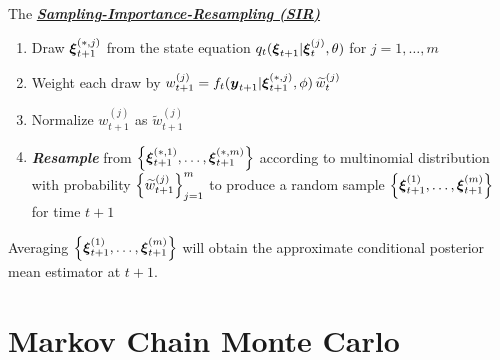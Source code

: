 \documentclass[11pt]{article}
\begin{document}
\begin{itemize}
The \underline{\emph{\textbf{Sampling-Importance-Resampling (SIR)}}}
\begin{enumerate}
\item Draw $\boldsymbol{\xi}_{t+1}^{(*,j)}$ from the state equation $q_{t}(\boldsymbol{\xi}_{t+1} | \boldsymbol{\xi}_{t}^{(j)}, \theta)$ for $j=1,\ldots, m$

\item Weight each draw by $w_{t+1}^{(j)} = f_{t}(\boldsymbol{y}_{t+1} | \boldsymbol{\xi}_{t+1}^{(*,j)}, \phi)\,\widetilde{w}_{t}^{(j)}$ 

\item Normalize $w_{t+1}^{(j)}$ as $\widetilde{w}_{t+1}^{(j)}$

\item \textbf{\emph{Resample}} from $\left\{\boldsymbol{\xi}_{t+1}^{(*,1)}, \ldots, \boldsymbol{\xi}_{t+1}^{(*,m)}\right\}$ according to multinomial distribution with probability $\left\{\widetilde{w}_{t+1}^{(j)}\right\}_{j=1}^{m}$ to produce a random sample $\left\{\boldsymbol{\xi}_{t+1}^{(1)}, \ldots, \boldsymbol{\xi}_{t+1}^{(m)}\right\}$ for time $t+1$
\end{enumerate}
Averaging $\left\{\boldsymbol{\xi}_{t+1}^{(1)}, \ldots, \boldsymbol{\xi}_{t+1}^{(m)}\right\}$ will obtain the approximate conditional posterior mean estimator at $t+1$.

\end{itemize}

\section{Markov Chain Monte Carlo}
\end{document}

